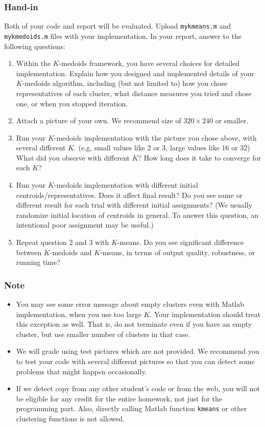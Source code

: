 \documentclass[twoside,10pt]{article}
\begin{document}
\subsubsection*{Hand-in}
Both of your code and report will be evaluated. Upload \texttt{mykmeans.m} and \texttt{mykmedoids.m} files with your implementation. In your report, answer to the following questions:
\begin{enumerate}
  \item Within the $K$-medoids framework, you have several choices for detailed implementation. Explain how you designed and implemented details of your $K$-medoids algorithm, including (but not limited to) how you chose representatives of each cluster, what distance measures you tried and chose one, or when you stopped iteration.
  \item Attach a picture of your own. We recommend size of $320 \times 240$ or smaller.
  \item Run your $K$-medoids implementation with the picture you chose above, with several different $K$. (e.g, small values like 2 or 3, large values like 16 or 32) What did you observe with different $K$? How long does it take to converge for each $K$?
  \item Run your $K$-medoids implementation with different initial centroids/representatives. Does it affect final result? Do you see same or different result for each trial with different initial assignments? (We usually randomize initial location of centroids in general. To answer this question, an intentional poor assignment may be useful.)
  \item Repeat question 2 and 3 with $K$-means. Do you see significant difference between $K$-medoids and $K$-means, in terms of output quality, robustness, or running time?
\end{enumerate}




\subsubsection*{Note}
\begin{itemize}
  \item You may see some error message about empty clusters even with Matlab implementation, when you use too large $K$. Your implementation should treat this exception as well. That is, do not terminate even if you have an empty cluster, but use smaller number of clusters in that case.

  \item We will grade using test pictures which are not provided. We recommend you to test your code with several different pictures so that you can detect some problems that might happen occasionally. 

  \item If we detect copy from any other student's code or from the web, you will not be eligible for any credit for the entire homework, not just for the programming part. Also, directly calling Matlab function \texttt{kmeans} or other clustering functions is not allowed.
\end{itemize}
\end{document}
